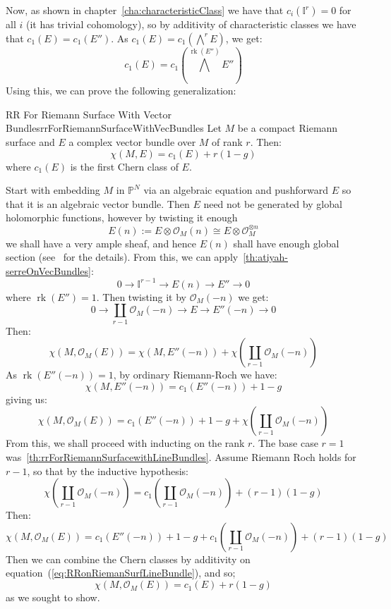 \documentclass{book}
\newenvironment{Proof}[1][]
  {\begin{ProofTcb}[#1]}
  {\end{ProofTcb}}
\newcommand{\BI}{{\mathbb{I}}}
\renewcommand{\P}{{\mathbb{P}}}
\newcommand{\CO}{{\mathcal{O}}}
\newcommand{\rk}{{\operatorname{rk}}}
\newcommand{\Dcup}{\coprod}
\begin{document}
Now, as shown in chapter~\ref{cha:characteristicClass} we have that $c_i(\BI^r) = 0$ for all $i$ (it has
trivial cohomology), so by additivity of
characteristic classes we have that $c_1(E) = c_1(E'')$. As $c_1(E) = c_1 \left(\bigwedge^r E\right)$, we get:
\[
  c_1(E) = c_1 \left(\bigwedge^{\rk(E'')}E''\right)
\]
Using this, we can prove the following generalization:

\begin{thm}{RR For Riemann Surface With Vector Bundles}{rrForRiemannSurfaceWithVecBundles}
  Let $M$ be a compact Riemann surface and $E$ a complex vector bundle over $M$ of rank $r$. Then:
  \[
    \chi(M, E) = c_1(E) + r(1-g)
  \]
  where $c_1(E)$ is the first Chern class of $E$.
\end{thm}

\begin{Proof}
  Start with embedding $M$ in $\P^N$ via an algebraic equation and pushforward $E$ so that it is an algebraic
  vector bundle. Then $E$ need not be generated by global holomorphic functions, however by twisting it enough
  \[
    E(n) := E\otimes \CO_M(n) \cong E\otimes \CO_M^{\otimes n}
  \]
  we shall have a very ample sheaf, and hence $E(n)$ shall have enough global section
  (see~\cite[section~4.4]{NateAlgGeo} for the details). From this, we can
  apply~\cref{th:atiyah-serreOnVecBundles}:
  \[
    0 \to \BI^{r-1} \to E(n) \to E'' \to 0
  \]
  where $\rk(E'') = 1$. Then twisting it by $\CO_M(-n)$ we get:
  \begin{equation}\label{eq:RRonRiemanSurfLineBundle}
    0 \to \Dcup_{r-1} \CO_M(-n) \to E \to E''(-n) \to 0
  \end{equation}
  Then:
  \[
    \chi(M, \CO_M(E)) = \chi(M, E''(-n)) + \chi \left( \Dcup_{r-1} \CO_M(-n)\right)
  \]
  As $\rk(E''(-n)) = 1$, by ordinary Riemann-Roch we have:
  \[
    \chi(M, E''(-n)) = c_1(E''(-n)) +1-g
  \]
  giving us:
  \[
    \chi(M, \CO_M(E)) = c_1(E''(-n)) +1-g  + \chi \left( \Dcup_{r-1} \CO_M(-n)\right)
  \]
  From this, we shall proceed with inducting on the rank $r$. The base case $r = 1$
  was~\cref{th:rrForRiemannSurfacewithLineBundles}. Assume Riemann Roch holds for $r-1$, so that by the
  inductive hypothesis:
  \[
    \chi \left( \Dcup_{r-1} \CO_M(-n)\right) = c_1 \left(\Dcup_{r-1} \CO_M(-n)\right) +(r-1)(1-g)
  \]
  Then:
  \[
    \chi(M, \CO_M(E)) = c_1(E''(-n)) +1-g  +c_1 \left(\Dcup_{r-1} \CO_M(-n)\right) +(r-1)(1-g)
  \]
  Then we can combine the Chern classes by additivity on equation~(\ref{eq:RRonRiemanSurfLineBundle}), and so;
  \[
    \chi(M, \CO_M(E)) = c_1(E) + r(1-g)
  \]
  as we sought to show.
\end{Proof}
\end{document}
